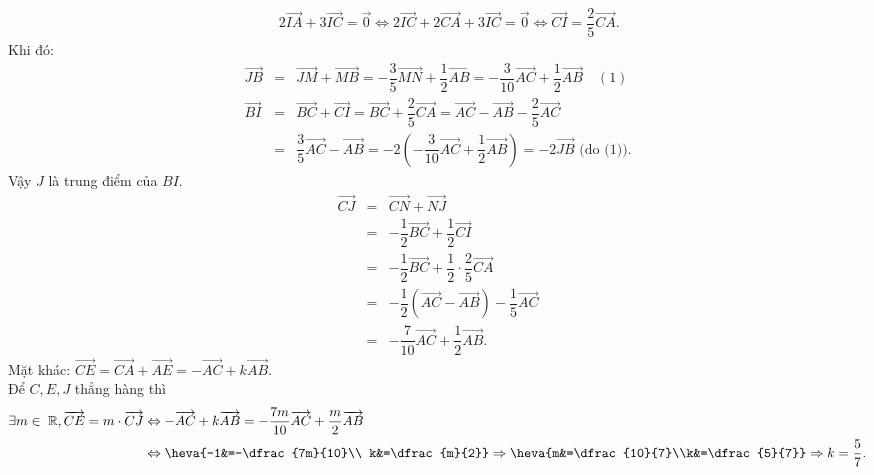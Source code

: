 \begin{ex}
{\begin{itemchoice}
\begin{eqnarray*}
				&&2\overrightarrow{IA}+3\overrightarrow{IC}=\overrightarrow{0}\Leftrightarrow 2\overrightarrow{IC}+2\overrightarrow{CA}+3\overrightarrow{IC}=\overrightarrow{0}\Leftrightarrow \overrightarrow{CI}=\dfrac{2}{5}\overrightarrow{CA}.
			\end{eqnarray*}
			Khi đó: 
			\begin{eqnarray*}
				\overrightarrow{JB}&=&\overrightarrow{JM}+\overrightarrow{MB}=-\dfrac{3}{5}\overrightarrow{MN}+\dfrac{1}{2}\overrightarrow{AB}=-\dfrac{3}{10}\overrightarrow{AC}+\dfrac{1}{2}\overrightarrow{AB}\quad(1) \\
				\overrightarrow{BI}&=&\overrightarrow{BC}+\overrightarrow{CI}=\overrightarrow{BC}+\dfrac{2}{5}\overrightarrow{CA}=\overrightarrow{AC}-\overrightarrow{AB}-\dfrac{2}{5}\overrightarrow{AC}\\
				&=&\dfrac{3}{5}\overrightarrow{AC}-\overrightarrow{AB}=-2\left(-\dfrac{3}{10}\overrightarrow{AC}+\dfrac{1}{2}\overrightarrow{AB}\right)=-2\overrightarrow{JB}\text{ (do (1)).}
			\end{eqnarray*}
			Vậy $J$ là trung điểm của $BI$.
			\itemch \begin{eqnarray*}
				\overrightarrow{CJ}&=&\overrightarrow{CN}+\overrightarrow{NJ}\\
				&=&-\dfrac{1}{2}\overrightarrow{BC}+\dfrac{1}{2}\overrightarrow{CI}\\
				&=&-\dfrac{1}{2}\overrightarrow{BC}+\dfrac{1}{2}\cdot\dfrac{2}{5}\overrightarrow{CA}\\
				&=&-\dfrac{1}{2}(\overrightarrow{AC}-\overrightarrow{AB})-\dfrac{1}{5}\overrightarrow{AC}\\
				&=&-\dfrac{7}{10}\overrightarrow{AC}+\dfrac{1}{2}\overrightarrow{AB}.
			\end{eqnarray*} 
			Mặt khác:  $\overrightarrow{CE}=\overrightarrow{CA}+\overrightarrow{AE}=-\overrightarrow{AC}+k\overrightarrow{AB}$.\\
			Để $C,E,J$ thẳng hàng thì
			$$\begin{aligned}
			\exists m\in\; \mathbb{R},\overrightarrow{CE}=m\cdot\overrightarrow{CJ}&\Leftrightarrow -\overrightarrow{AC}+k\overrightarrow{AB}=-\dfrac{7m}{10}\overrightarrow{AC}+\dfrac{m}{2}\overrightarrow{AB}\\
			&\Leftrightarrow \heva{-1&=-\dfrac{7m}{10}\\
				k&=\dfrac{m}{2}}\Rightarrow \heva{m&=\dfrac{10}{7}\\k&=\dfrac{5}{7}}\Rightarrow k=\dfrac{5}{7}.
\end{aligned}			 
			$$
		\end{itemchoice}}
\end{ex}
